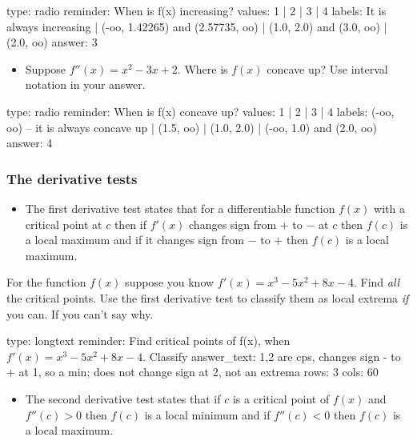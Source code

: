 \documentclass[12pt]{article}
\begin{document}
\begin{answer}
type: radio
reminder: When is f(x) increasing?
values: 1 | 2 | 3 | 4
labels: It is always increasing | (-oo, 1.42265) and (2.57735, oo) | (1.0, 2.0) and (3.0, oo) | (2.0, oo)
answer: 3
\end{answer}

\begin{itemize}
\itemsep1pt\parskip0pt
\item
  Suppose $f''(x) = x^2 - 3x + 2$. Where is $f(x)$ concave up? Use
  interval notation in your answer.
\end{itemize}

\begin{answer}
type: radio
reminder: When is f(x) concave up?
values: 1 | 2 | 3 | 4
labels: (-oo, oo) -- it is always concave up | (1.5, oo) | (1.0, 2.0) | (-oo, 1.0) and (2.0, oo)
answer: 4
\end{answer}

\subsubsection{The derivative tests}

\begin{itemize}
\itemsep1pt\parskip0pt
\item
  The first derivative test states that for a differentiable function
  $f(x)$ with a critical point at $c$ then if $f'(x)$ changes sign from
  $+$ to $-$ at $c$ then $f(c)$ is a local maximum and if it changes
  sign from $-$ to $+$ then $f(c)$ is a local maximum.
\end{itemize}

For the function $f(x)$ suppose you know $f'(x)=x^3 - 5x^2 + 8x - 4$.
Find \emph{all} the critical points. Use the first derivative test to
classify them as local extrema \emph{if} you can. If you can't say why.

\begin{answer}
type: longtext
reminder: Find critical points of f(x), when \( f'(x)=x^3 - 5x^2 + 8x -4 \). Classify
answer_text: 1,2 are cps, changes sign - to + at 1, so a min; does not change sign at 2, not an extrema 
rows: 3
cols: 60
\end{answer}

\begin{itemize}
\itemsep1pt\parskip0pt
\item
  The second derivative test states that if $c$ is a critical point of
  $f(x)$ and $f''(c) > 0$ then $f(c)$ is a local minimum and if
  $f''(c) < 0$ then $f(c)$ is a local maximum.
\end{itemize}
\end{document}
